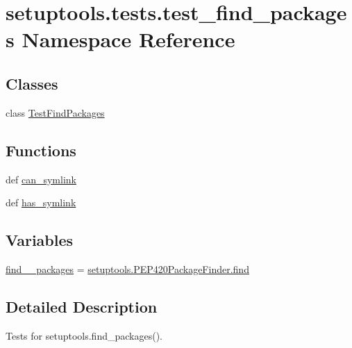 \hypertarget{namespacesetuptools_1_1tests_1_1test__find__packages}{}\section{setuptools.\+tests.\+test\+\_\+find\+\_\+packages Namespace Reference}
\label{namespacesetuptools_1_1tests_1_1test__find__packages}
\subsection*{Classes}
\begin{DoxyCompactItemize}
\item 
class \hyperlink{classsetuptools_1_1tests_1_1test__find__packages_1_1TestFindPackages}{Test\+Find\+Packages}
\end{DoxyCompactItemize}
\subsection*{Functions}
\begin{DoxyCompactItemize}
\item 
def \hyperlink{namespacesetuptools_1_1tests_1_1test__find__packages_a6c6c9a6d48466c28a875eaa42e042534}{can\+\_\+symlink}
\item 
def \hyperlink{namespacesetuptools_1_1tests_1_1test__find__packages_a3f07834fadf7653abe2d30ae8e9c44db}{has\+\_\+symlink}
\end{DoxyCompactItemize}
\subsection*{Variables}
\begin{DoxyCompactItemize}
\item 
\hyperlink{namespacesetuptools_1_1tests_1_1test__find__packages_ae211435526df6338c64e787608a61efb}{find\+\_\+\_\+packages} = \hyperlink{classsetuptools_1_1PackageFinder_a5beee00ee08abffe24ff500f359389f7}{setuptools.\+P\+E\+P420\+Package\+Finder.\+find}
\end{DoxyCompactItemize}


\subsection{Detailed Description}
\begin{DoxyVerb}Tests for setuptools.find_packages().\end{DoxyVerb}
 

